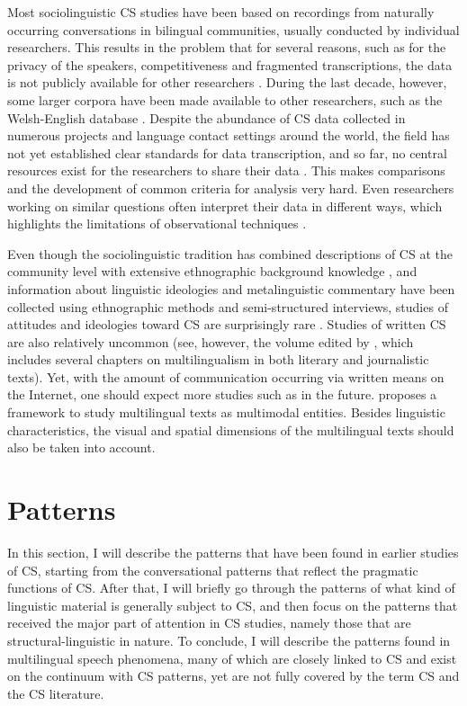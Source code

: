 \documentclass[output=paper]{langscibook}
\begin{document}
Most sociolinguistic CS studies have been based on recordings from naturally occurring conversations in bilingual communities, usually conducted by individual researchers. This results in the problem that for several reasons, such as for the privacy of the speakers, competitiveness and fragmented transcriptions, the data is not publicly available for other researchers \parencite[23]{gullberg2009technique}. During the last decade, however, some larger corpora have been made available to other researchers, such as the Welsh-English database \citep{deuchar2014building}. Despite the abundance of CS data collected in numerous projects and language contact settings around the world, the field has not yet established clear standards for data transcription, and so far, no central resources exist for the researchers to share their data \parencite{gardner2009code}. This makes comparisons and the development of common criteria for analysis very hard. Even researchers working on similar questions often interpret their data in different ways, which highlights the limitations of observational techniques \parencite{gullberg2009technique}.

Even though the sociolinguistic tradition has combined descriptions of CS at the community level with extensive ethnographic background knowledge \citep[18]{gardner2009code}, and information about linguistic ideologies and metalinguistic commentary have been collected using ethnographic methods and semi-structured interviews, studies of attitudes and ideologies toward CS are surprisingly rare \parencite{gardner2009code, garrett2010attitudes}. Studies of written CS are also relatively uncommon (see, however, the volume edited by \citealt{enghelsetal2021cruzando}, which includes several chapters on multilingualism in both literary and journalistic texts). Yet, with the amount of communication occurring via written means on the Internet, one should expect more studies such as \textcite{treffers2022explaining} in the future. \textcite{sebba2013multilingualism} proposes a framework to study multilingual texts as multimodal entities. Besides linguistic characteristics, the visual and spatial dimensions of the multilingual texts should also be taken into account.


\section{Patterns} \label{patterns}

In this section, I will describe the patterns that have been found in earlier studies of CS, starting from the conversational patterns that reflect the pragmatic functions of CS. After that, I will briefly go through the patterns of what kind of linguistic material is generally subject to CS, and then focus on the patterns that received the major part of attention in CS studies, namely those that are structural-linguistic in nature. To conclude, I will describe the patterns found in multilingual speech phenomena, many of which are closely linked to CS and exist on the continuum with CS patterns, yet are not fully covered by the term CS and the CS literature. 
\end{document}
